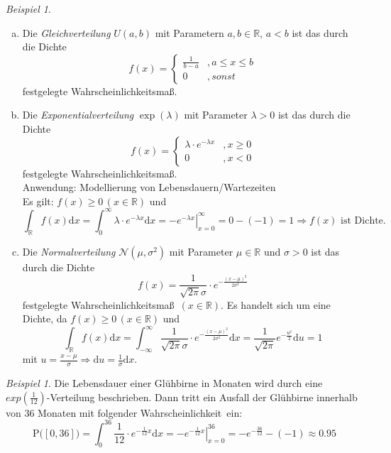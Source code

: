 \documentclass[a4paper,12pt,fleqn]{scrartcl}
\newcommand{\R}{\mathbb{R}}
\newcommand{\m}[1]{\mathcal{ #1 }}
\newcommand{\p}[1]{\text{P(} #1 \text{)}}
\newcommand{\WM}{Wahrscheinlichkeitsmaß}
\newcommand{\Wk}{Wahrscheinlichkeit}
\newcommand{\impl}{\Rightarrow}
\theoremstyle{definition}
\theoremstyle{plain}
\theoremstyle{remark}
\newtheorem{beispiel}[definition]{Beispiel}
\begin{document}
\begin{beispiel}
\begin{enumerate}[a)]
\item Die \emph{Gleichverteilung} $U(a,b)$ mit Parametern $a,b\in\R$, $a<b$ ist das durch die Dichte
\[f(x)=\begin{cases}\frac{1}{b-a}&,a\leq x\leq b\\
0&,sonst
\end{cases}\]
festgelegte \WM.

\item Die \emph{Exponentialverteilung} $\exp(\lambda)$ mit Parameter $\lambda > 0$ ist das durch die Dichte
\[f(x)=\begin{cases}\lambda \cdot e^{-\lambda x} &,x \geq 0 \\ 0 &, x < 0\end{cases}\]
festgelegte \WM.\\
Anwendung: Modellierung von Lebensdauern/Wartezeiten\\
Es gilt: $f(x) \geq 0 \, (x \in \R)$ und
\[\int_{\R}f(x)\mathrm{d}x = \int_0^\infty \lambda \cdot e^{-\lambda x} \mathrm{d}x = \left. -e^{-\lambda x} \right|_{x=0}^\infty = 0 - (-1) = 1 \impl f(x) \text{ ist Dichte.}\]
\item Die \emph{Normalverteilung} $\m{N}(\mu, \sigma^2)$ mit Parameter $\mu \in \R$ und $\sigma > 0$ ist das durch die Dichte
\[f(x)=\frac{1}{\sqrt{2\pi} \sigma} \cdot e^{-\frac{(x-\mu)^2}{2 \sigma^2}}\]
festgelegte \WM \, $(x \in \R)$. Es handelt sich um eine Dichte, da $f(x) \geq 0 \, (x \in \R)$ und
\[\int_{\R}f(x)\mathrm{d}x = \int_{-\infty}^{\infty} \frac{1}{\sqrt{2\pi} \sigma} \cdot e^{-\frac{(x-\mu)^2}{2 \sigma^2}} \mathrm{d}x = \frac{1}{\sqrt{2 \pi}} e^{-\frac{u^2}{2}} \mathrm{d}u = 1\]
mit $u = \frac{x-\mu}{\sigma} \impl \mathrm{d}u = \frac{1}{\sigma} \mathrm{d}x$.
\end{enumerate}
\end{beispiel}
\begin{beispiel}
Die Lebensdauer einer Glühbirne in Monaten wird durch eine $exp(\frac{1}{12})$-Verteilung beschrieben. Dann tritt ein Ausfall der Glühbirne innerhalb von 36 Monaten mit folgender \Wk \, ein:
\[\p{[0,36]} = \int_0^{36} \frac{1}{12} \cdot e^{-\frac{1}{12}x} \mathrm{d}x = \left. -e^{-\frac{1}{12}x} \right|_{x=0}^{36} = -e^{-\frac{36}{12}}-(-1) \approx 0.95\]
\end{beispiel}
\end{document}
